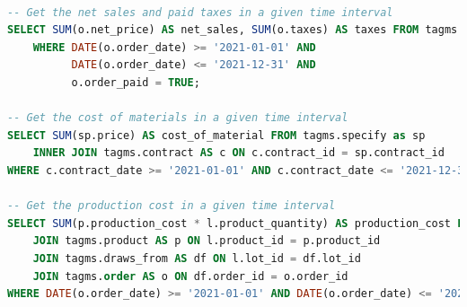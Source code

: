 \begin{lstlisting}[language=SQL,
	keywordstyle=\color{blue},
	stringstyle=\color{mauve},
	showstringspaces=false,
	breaklines=true,
	basicstyle=\ttfamily\footnotesize]
	
-- Get the net sales and paid taxes in a given time interval
SELECT SUM(o.net_price) AS net_sales, SUM(o.taxes) AS taxes FROM tagms.order AS o
    WHERE DATE(o.order_date) >= '2021-01-01' AND
          DATE(o.order_date) <= '2021-12-31' AND
          o.order_paid = TRUE;

-- Get the cost of materials in a given time interval
SELECT SUM(sp.price) AS cost_of_material FROM tagms.specify as sp
    INNER JOIN tagms.contract AS c ON c.contract_id = sp.contract_id
WHERE c.contract_date >= '2021-01-01' AND c.contract_date <= '2021-12-31';

-- Get the production cost in a given time interval
SELECT SUM(p.production_cost * l.product_quantity) AS production_cost FROM tagms.lot AS l
    JOIN tagms.product AS p ON l.product_id = p.product_id
    JOIN tagms.draws_from AS df ON l.lot_id = df.lot_id
    JOIN tagms.order AS o ON df.order_id = o.order_id
WHERE DATE(o.order_date) >= '2021-01-01' AND DATE(o.order_date) <= '2021-12-31';

\end{lstlisting}

